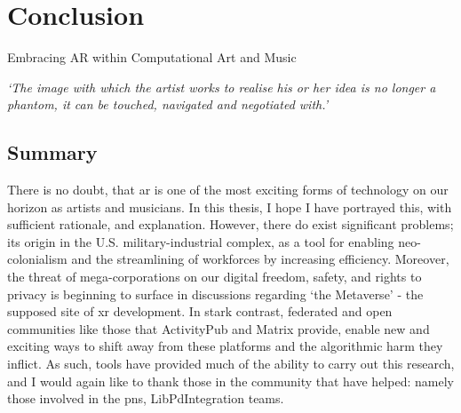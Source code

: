 \chapter{Conclusion}{Embracing AR within Computational Art and Music}
\label{sec: conclusion}
\epigraph{\textit{`The image with which the artist works to realise his or her idea is no longer a phantom, it can be touched, navigated and negotiated with.'}}{\citep[p.5]{ryan1991}}


\clearpage

\section{Summary}\label{sec: conclusion-summary}
There is no doubt, that \gls{ar} is one of the most exciting forms of technology on our horizon as artists and musicians. In this thesis, I hope I have portrayed this, with sufficient rationale, and explanation. However, there do exist significant problems; its origin in the U.S. military-industrial complex, as a tool for enabling neo-colonialism and the streamlining of workforces by increasing efficiency. Moreover, the threat of mega-corporations on our digital freedom, safety, and rights to privacy is beginning to surface in discussions regarding `the Metaverse' - the supposed site of \gls{xr} development. In stark contrast, federated and open communities like those that ActivityPub and Matrix provide, enable new and exciting ways to shift away from these platforms and the algorithmic harm they inflict. As such,  tools have provided much of the ability to carry out this research, and I would again like to thank those in the community that have helped: namely those involved in the \gls{pns}, LibPdIntegration teams.

